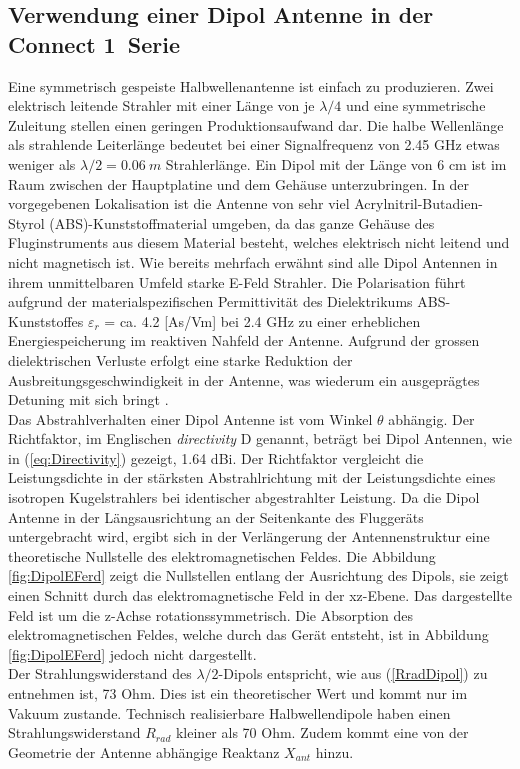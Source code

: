\subsection{Verwendung einer Dipol Antenne in der \glqq Connect 1\grqq \ Serie}
Eine symmetrisch gespeiste Halbwellenantenne ist einfach zu produzieren. Zwei elektrisch leitende Strahler mit  einer Länge von je $\lambda/4$ und eine symmetrische Zuleitung stellen einen geringen Produktionsaufwand dar. Die halbe Wellenlänge als strahlende Leiterlänge bedeutet bei einer Signalfrequenz von 2.45 GHz etwas weniger als $\lambda/2=0.06\  m$ Strahlerlänge. Ein Dipol mit der Länge von 6 cm ist im Raum zwischen der Hauptplatine und dem Gehäuse unterzubringen. 
In der vorgegebenen Lokalisation ist die Antenne von sehr viel Acrylnitril-Butadien-Styrol (ABS)-Kunststoffmaterial umgeben, da das ganze Gehäuse des Fluginstruments aus diesem Material besteht, welches elektrisch nicht leitend und nicht magnetisch ist. Wie bereits mehrfach erwähnt sind alle Dipol Antennen in ihrem unmittelbaren Umfeld starke E-Feld Strahler. Die Polarisation führt aufgrund der materialspezifischen Permittivität des Dielektrikums ABS-Kunststoffes $\varepsilon_r$ = ca. 4.2 [As/Vm] bei 2.4 GHz zu einer erheblichen Energiespeicherung im reaktiven Nahfeld der Antenne. Aufgrund der grossen dielektrischen Verluste erfolgt eine starke Reduktion der Ausbreitungsgeschwindigkeit in der Antenne, was wiederum ein ausgeprägtes Detuning mit sich bringt \cite{WikiPermitt}.\\
Das Abstrahlverhalten einer Dipol Antenne ist vom Winkel $\theta$ abhängig. Der Richtfaktor, im Englischen \textit{directivity} D genannt, beträgt bei Dipol Antennen, wie in (\ref{eq:Directivity}) gezeigt, 1.64 dBi. Der Richtfaktor vergleicht die Leistungsdichte in der stärksten Abstrahlrichtung mit der Leistungsdichte eines isotropen Kugelstrahlers bei identischer abgestrahlter Leistung. Da die Dipol Antenne in der Längsausrichtung an der Seitenkante des Fluggeräts untergebracht wird, ergibt sich in der Verlängerung der Antennenstruktur eine theoretische Nullstelle des elektromagnetischen Feldes. Die Abbildung \ref{fig:DipolEFerd} zeigt die Nullstellen entlang der Ausrichtung des Dipols, sie zeigt einen Schnitt durch das elektromagnetische Feld in der xz-Ebene. Das dargestellte Feld ist um die z-Achse rotationssymmetrisch. Die Absorption des elektromagnetischen Feldes, welche durch das Gerät entsteht, ist in Abbildung \ref{fig:DipolEFerd} jedoch nicht dargestellt.\\
Der Strahlungswiderstand des $\lambda/2$-Dipols entspricht, wie aus (\ref{RradDipol}) zu entnehmen ist, 73 Ohm. Dies ist ein theoretischer Wert und kommt nur im Vakuum zustande. Technisch realisierbare Halbwellendipole haben einen Strahlungswiderstand $R_{rad}$ kleiner als 70 Ohm. Zudem kommt eine von der Geometrie der Antenne abhängige Reaktanz $X_{ant}$ hinzu.

